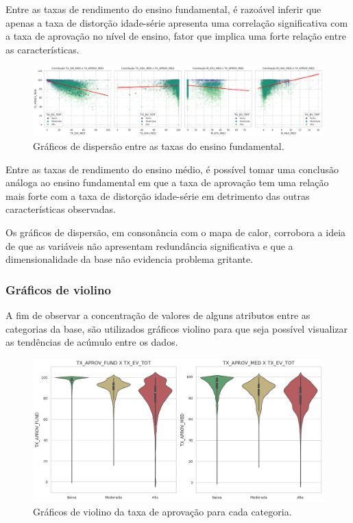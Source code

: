 \par Entre as taxas de rendimento do ensino fundamental, é razoável inferir que apenas a taxa de distorção idade-série apresenta uma correlação significativa com a taxa de aprovação no nível de ensino, fator que implica uma forte relação entre as características.

\begin{figure}[H]
    \centering
    \includegraphics[scale = 0.3]{Graphics/Disp-Med.png}
    \caption{Gráficos de dispersão entre as taxas do ensino fundamental.}
    \label{fig:disp-med}
\end{figure}

\par Entre as taxas de rendimento do ensino médio, é possível tomar uma conclusão análoga ao ensino fundamental em que a taxa de aprovação tem uma relação mais forte com a taxa de distorção idade-série em detrimento das outras características observadas.

\par Os gráficos de dispersão, em consonância com o mapa de calor, corrobora a ideia de que as variáveis não apresentam redundância significativa e que a dimensionalidade da base não evidencia problema gritante.

\subsubsection{Gráficos de violino}

\par A fim de observar a concentração de valores de alguns atributos entre as categorias da base, são utilizados gráficos violino para que seja possível visualizar as tendências de acúmulo entre os dados.

\begin{figure}[H]
    \centering
    \includegraphics[scale = 0.4]{Graphics/Vio-Aprov.png}
    \caption{Gráficos de violino da taxa de aprovação para cada categoria.}
    \label{fig:enter-label}
\end{figure}

